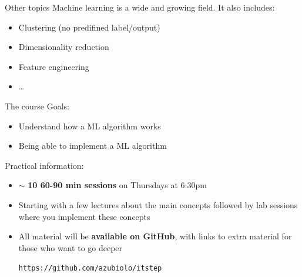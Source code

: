 \documentclass{beamer}
\begin{document}
\begin{frame}{Other topics}
\vfill
Machine learning is a wide and growing field. It also includes:	
\pause 
\vfill
\begin{itemize}
	\item Clustering (no predifined label/output)
\pause 
\vfill
	\item Dimensionality reduction
\pause 
\vfill
	\item Feature engineering
\pause 
\vfill
	\item \ldots
\end{itemize}
\vfill
\end{frame}

\begin{frame}{The course}
Goals:
\begin{itemize}
	\item Understand how a ML algorithm works
	\item Being able to implement a ML algorithm
\end{itemize}
\vfill
\pause 
Practical information:
\begin{itemize}
	\item $\sim$ \textbf{10 60-90 min sessions} on Thursdays at 6:30pm
	\item Starting with a few lectures about the main concepts followed by lab sessions where you implement these concepts
	\item All material will be \textbf{available on GitHub}, with links to extra material for those who want to go deeper
	\vfill
	\begin{center}
	\texttt{https://github.com/azubiolo/itstep}
	\end{center}
	\vfill
\end{itemize}
\end{frame}
\end{document}
